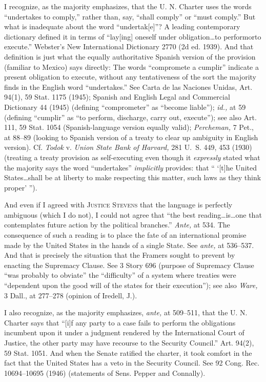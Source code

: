 {  I recognize, as the majority emphasizes, that the U. N. Charter
uses the words ``undertakes to comply,'' rather than, say, ``shall
comply'' or ``must comply.'' But what is inadequate about the word
``undertak[e]''? A leading contemporary dictionary defined it in
terms of ``lay[ing] oneself under obligation\dots to performorto
execute.'' Webster's New International Dictionary 2770 (2d ed.
1939). And that definition is just what the equally authoritative
Spanish version of the provision (familiar to Mexico) says directly:
The words ``compromete a cumplir'' indicate a present obligation
to execute, without any tentativeness of the sort the majority finds
in the English word ``undertakes.'' See Carta de las Naciones
Unidas, Art. 94(1), 59 Stat. 1175 (1945); Spanish and English Legal and
Commercial Dictionary 44 (1945) (defining ``comprometer'' as ``become
liable''); \emph{id.,} at 59 (defining ``cumplir'' as ``to perform,
discharge, carry out, execute''); see also Art. 111, 59 Stat. 1054
(Spanish-language version equally valid); \emph{Percheman,} 7 Pet., at
88--89 (looking to Spanish version of a treaty to clear up ambiguity in
English version). Cf. \emph{Todok} v. \emph{Union State Bank of Harvard,} 281
U.~S. 449, 453 (1930) (treating a treaty provision as self-executing
even though it \emph{expressly} stated what the majority says the \newpage 
word ``undertakes'' \emph{implicitly} provides: that `` ‘[t]he United
States\dots shall be at liberty to make respecting this matter, such
laws as they think proper' '').

  And even if I agreed with \textsc{Justice Stevens} that the language is
perfectly ambiguous (which I do not), I could not agree that ``the
best reading\dots is\dots one that contemplates future action by
the political branches.'' \emph{Ante,} at 534. The consequence of
such a reading is to place the fate of an international promise made by
the United States in the hands of a single State. See \emph{ante,} at
536--537. And that is precisely the situation that the Framers sought
to prevent by enacting the Supremacy Clause. See 3 Story 696 (purpose
of Supremacy Clause ``was probably to obviate'' the ``difficulty''
of a system where treaties were ``dependent upon the good will of the
states for their execution''); see also \emph{Ware,} 3 Dall., at 277--278
(opinion of Iredell, J.).

  I also recognize, as the majority emphasizes, \emph{ante,} at
509--511, that the U. N. Charter says that ``[i]f any party to a
case fails to perform the obligations incumbent upon it under a judgment
rendered by the International Court of Justice, the other party may have
recourse to the Security Council.'' Art. 94(2), 59 Stat. 1051. And
when the Senate ratified the charter, it took comfort in the fact that
the United States has a veto in the Security Council. See 92 Cong.
Rec. 10694--10695 (1946) (statements of Sens. Pepper and Connally).

}
